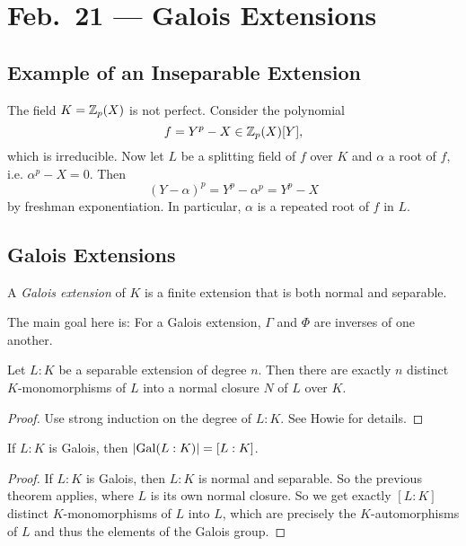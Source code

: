 \chapter{Feb.~21 --- Galois Extensions}

\section{Example of an Inseparable Extension}

\begin{example}
  The field $K = \mathbb{Z}_p(X)$ is not perfect. Consider
  the polynomial
  \[
    f = Y^p - X \in \mathbb{Z}_p(X)[Y],
  \]
  which is irreducible. Now let $L$ be a splitting
  field of $f$ over $K$ and $\alpha$ a root of $f$,
  i.e. $\alpha^p - X = 0$. Then
  \[
    (Y - \alpha)^p = Y^p - \alpha^p = Y^p - X
  \]
  by freshman exponentiation. In particular,
  $\alpha$ is a repeated root of $f$ in $L$.
\end{example}

\section{Galois Extensions}

\begin{definition}
  A \emph{Galois extension} of $K$ is a finite extension
  that is both normal and separable.
\end{definition}

\begin{remark}
  The main goal here is: For a Galois extension,
  $\Gamma$ and $\Phi$ are inverses of one another.
\end{remark}

\begin{theorem}
  Let $L : K$ be a separable extension of degree
  $n$. Then there are exactly $n$ distinct
  $K$-monomorphisms of $L$ into a normal closure $N$
  of $L$ over $K$.
\end{theorem}

\begin{proof}
  Use strong induction on the degree of $L : K$.
  See Howie for details.
\end{proof}

\begin{corollary}
  \label{cor:galois-size}
  If $L : K$ is Galois, then
  $|{\operatorname{Gal}(L : K)}| = [L : K]$.
\end{corollary}

\begin{proof}
  If $L : K$ is Galois, then $L : K$ is normal
  and separable. So the previous theorem applies,
  where $L$ is its own normal closure. So we get exactly
  $[L : K]$ distinct $K$-monomorphisms of $L$ into $L$,
  which are precisely the $K$-automorphisms of $L$ and
  thus the elements of the Galois group.
\end{proof}

